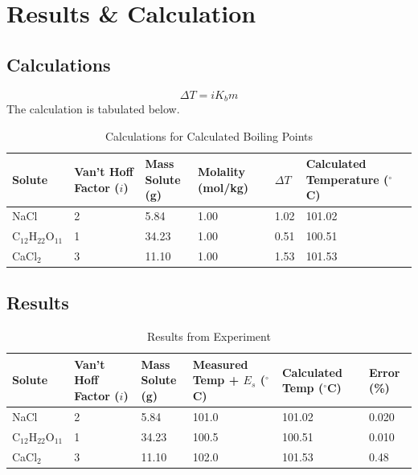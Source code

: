 \section{Results \& Calculation}\label{sec:results}

\subsection{Calculations}
\[\Delta T = iK_bm\]
The calculation is tabulated below.
\begin{table}[h]
  \begin{center}
    \begin{tabular}{|l|l|l|l|l|l|}
      \hline
      Solute & \makecell{Van't Hoff\\Factor ($i$)} & \makecell{Mass\\Solute (g)} & Molality (mol/kg) & $\Delta T$ & \makecell{Calculated\\Temperature ($^\circ$C)}\\
      \hline
      NaCl & 2 & 5.84 & 1.00 & 1.02 & 101.02\\
      \hline
      $\text{C}_{12}\text{H}_{22}\text{O}_{11}$ & 1 & 34.23 & 1.00 & 0.51 & 100.51\\
      \hline
      CaCl$_2$ & 3 & 11.10 & 1.00 & 1.53 & 101.53\\
      \hline
    \end{tabular}
    \caption{Calculations for Calculated Boiling Points}\label{tab:calculation}
  \end{center}
\end{table}

\subsection{Results}
\begin{table}[h]
  \begin{center}
    \begin{tabular}{|l|l|l|l|l|l|}
      \hline
      Solute & \makecell{Van't Hoff\\Factor ($i$)} & \makecell{Mass\\Solute (g)} & \makecell{Measured\\Temp + $E_s$ ($^\circ$C)} & \makecell{Calculated\\Temp ($^\circ$C)} & Error (\%)\\
      \hline
      NaCl & 2 & 5.84 & 101.0 & 101.02 & 0.020\\
      \hline
      $\text{C}_{12}\text{H}_{22}\text{O}_{11}$ & 1 & 34.23 & 100.5 & 100.51 & 0.010\\
      \hline
      CaCl$_2$ & 3 & 11.10 & 102.0 & 101.53 & 0.48\\
      \hline
    \end{tabular}
    \caption{Results from Experiment}\label{tab:results}
  \end{center}
\end{table}


